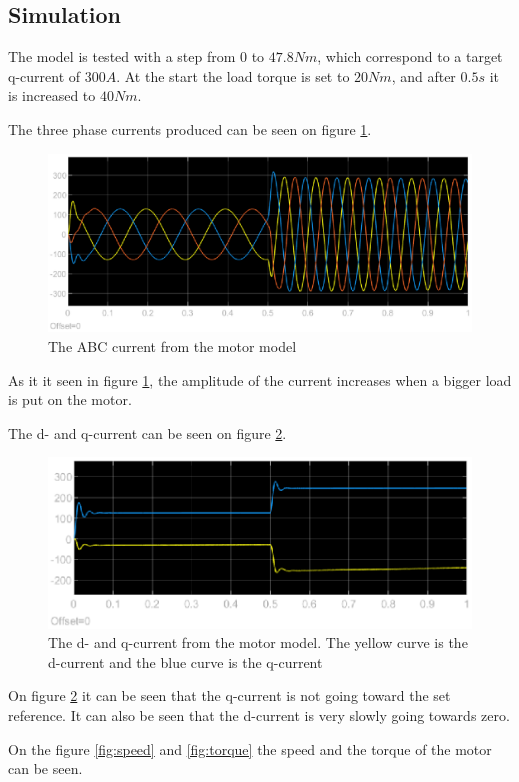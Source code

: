 \subsection{Simulation}
\label{sec:simulation}
The model is tested with a step from $0$ to $47.8 Nm$, which correspond to a target q-current of $300 A $. At the start the load torque is set to $20 Nm$, and after $0.5 s$ it is increased to $40 Nm$. 

The three phase currents produced can be seen on figure \ref{fig:iabc}.

\begin{figure}[H]
	\centering
	\includegraphics[width=0.6\linewidth]{pictures/control/iabc.eps}
	\caption{The ABC current from the motor model}
	\label{fig:iabc}
\end{figure}

As it it seen in figure \ref{fig:iabc}, the amplitude of the current increases when a bigger load is put on the motor. 

The d- and q-current can be seen on figure \ref{fig:idq}.

\begin{figure}[H]
	\centering
	\includegraphics[width=0.6\linewidth]{pictures/control/idq.eps}
	\caption{The d- and q-current from the motor model. The yellow curve is the d-current and the blue curve is the q-current}
	\label{fig:idq}
\end{figure}

On figure \ref{fig:idq} it can be seen that the q-current is not going toward the set reference. It can also be seen that the d-current is very slowly going towards zero.

On the figure \ref{fig:speed} and \ref{fig:torque} the speed and the torque of the motor can be seen.

